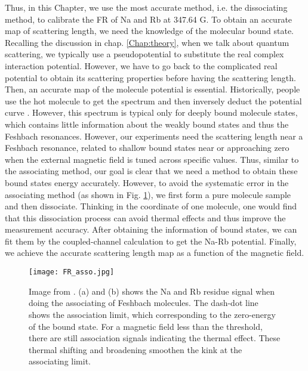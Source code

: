 Thus, in this Chapter, we use the most accurate method, i.e. the dissociating method, to calibrate the FR of Na and Rb at 347.64 G. To obtain an accurate map of scattering length, we need the knowledge of the molecular bound state. Recalling the discussion in chap. \ref{Chap:theory}, when we talk about quantum scattering, we typically use a pseudopotential to substitute the real complex interaction potential. However, we have to go back to the complicated real potential to obtain its scattering properties before having the scattering length. Then, an accurate map of the molecule potential is essential. Historically, people use the hot molecule to get the spectrum and then inversely deduct the potential curve \cite{}. However, this spectrum is typical only for deeply bound molecule states, which contains little information about the weakly bound states and thus the Feshbach resonances. However, our experiments need the scattering length near a Feshbach resonance, related to shallow bound states near or approaching zero when the external magnetic field is tuned across specific values. Thus, similar to the associating method, our goal is clear that we need a method to obtain these bound states energy accurately. However, to avoid the systematic error in the associating method (as shown in Fig. \ref{FR_asso}), we first form a pure molecule sample and then dissociate. Thinking in the coordinate of one molecule, one would find that this dissociation process can avoid thermal effects and thus improve the measurement accuracy. After obtaining the information of bound states, we can fit them by the coupled-channel calculation to get the Na-Rb potential. Finally, we achieve the accurate scattering length map as a function of the magnetic field. 

\begin{figure}[htb]
\begin{center}
\texttt{[image: FR\_asso.jpg]}
\end{center}
\caption[Association spectrum of Na and Rb near 347.64 G. (Image from \cite{wang2015formation})]{Image from \cite{wang2015formation}. (a) and (b) shows the Na and Rb residue signal when doing the associating of Feshbach molecules. The dash-dot line shows the association limit, which corresponding to the zero-energy of the bound state. For a magnetic field less than the threshold, there are still association signals indicating the thermal effect. These thermal shifting and broadening smoothen the kink at the associating limit.}
\label{FR_asso}
\end{figure}

